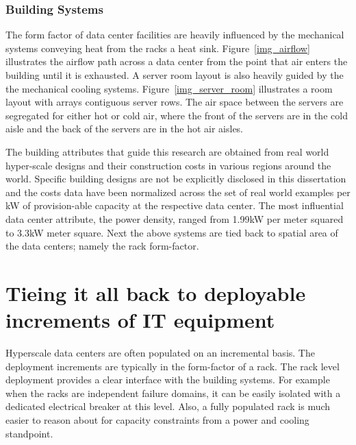         
        
        
        
        \subsubsection{Building Systems}
        
        The form factor of data center facilities are heavily influenced by the mechanical systems conveying heat from the racks a heat sink. Figure~\ref{img_airflow} illustrates the airflow path across a data center from the point that air enters the building until it is exhausted. A server room layout is also heavily guided by the the mechanical cooling systems. Figure~\ref{img_server_room} illustrates a room layout with arrays contiguous server rows. The air space between the servers are segregated for either hot or cold air, where the front of the servers are in the cold aisle and the back of the servers are in the hot air aisles. 
        
        
        
        
        The building attributes that guide this research are obtained from real world hyper-scale designs and their construction costs in various regions around the world. Specific building designs are not be explicitly disclosed in this dissertation and the costs data have been normalized across the set of real world examples per kW of provision-able capacity at the respective data center. The most influential data center attribute, the power density, ranged from 1.99kW per meter squared to 3.3kW meter square. Next the above systems are tied back to spatial area of the data centers; namely the rack form-factor. 
        
        
        
    \section{Tieing it all back to deployable increments of IT equipment}
    
    Hyperscale data centers are often populated on an incremental basis. The deployment increments are typically in the form-factor of a rack. The rack level deployment provides a clear interface with the building systems. For example when the racks are independent failure domains, it can be easily isolated with a dedicated electrical breaker at this level. Also, a fully populated rack is much easier to reason about for capacity constraints from a power and cooling standpoint. 
    

